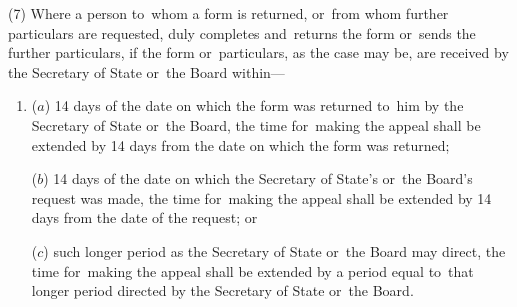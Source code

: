 \documentclass[12pt,a4paper]{article}
\begin{document}
%
%

(7) Where a person to~whom a form is returned, or~from whom further particulars are requested, duly completes and~returns the form or~sends the further particulars, if the form or~particulars, as the case may be, are received by the Secretary of State or~the Board within—
\begin{enumerate}\item[]
($a$) 14 days of the date on which the form was returned to~him by the Secretary of State or~the Board, the time for~making the appeal shall be extended by 14 days from the date on which the form was returned;

($b$) 14 days of the date on which the Secretary of State’s or~the Board’s request was made, the time for~making the appeal shall be extended by 14 days from the date of the request; or

($c$) such longer period as the Secretary of State or~the Board may direct, the time for~making the appeal shall be extended by a period equal to~that longer period directed by the Secretary of State or~the Board.
\end{enumerate}
\end{document}
